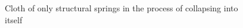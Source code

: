 \begin{figure}[H]
    \centering
    \caption{Cloth of only structural springs in the process of collapsing into itself}
    \label{fig:structural_springs_collapsing}
\end{figure}


